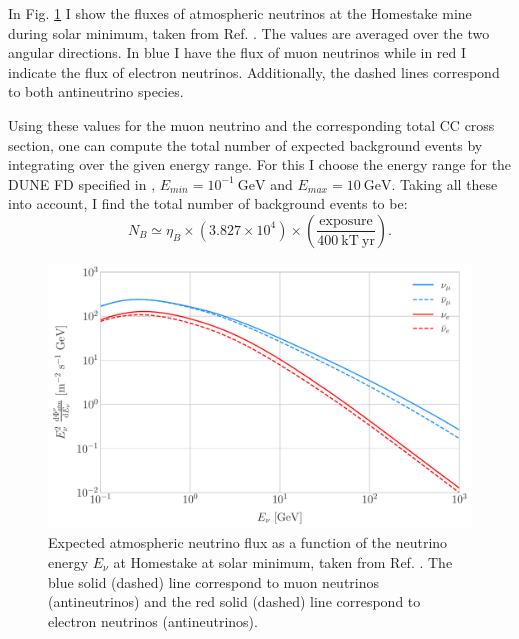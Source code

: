 In Fig. \ref{fig:homestake_fluxes} I show the fluxes of atmospheric neutrinos at the Homestake mine during solar minimum, taken from Ref. \cite{Honda2015}. The values are averaged over the two angular directions. In blue I have the flux of muon neutrinos while in red I indicate the flux of electron neutrinos. Additionally, the dashed lines correspond to both antineutrino species.

Using these values for the muon neutrino and the corresponding total CC cross section, one can compute the total number of expected background events by integrating over the given energy range. For this I choose the energy range for the DUNE FD specified in \cite{DUNE2020TDR2}, $E_{min} = 10^{-1} \ \mathrm{GeV}$ and $E_{max} = 10 \ \mathrm{GeV}$. Taking all these into account, I find the total number of background events to be:
\begin{equation}\label{4.4}
	N_{B} \simeq  \eta_{B} \times \left(3.827 \times 10^{4}\right) \times \left(\frac{\mathrm{exposure}}{400 \ \mathrm{kT \ yr}}\right).
\end{equation}

\begin{figure}[t]
	\centering
	\includegraphics[width=0.9\linewidth]{Images/DM_Analysis/homestake_fluxes}
	\caption[Expected atmospheric neutrino flux as a function of the neutrino energy $E_{\nu}$ at Homestake at solar minimum.]{Expected atmospheric neutrino flux as a function of the neutrino energy $E_{\nu}$ at Homestake at solar minimum, taken from Ref. \cite{Honda2015}. The blue solid (dashed) line correspond to muon neutrinos (antineutrinos) and the red solid (dashed) line correspond to electron neutrinos (antineutrinos).}
	\label{fig:homestake_fluxes}
\end{figure}

